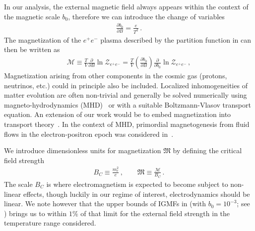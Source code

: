 In our analysis, the external magnetic field always appears within the context of the magnetic scale $b_{0}$, therefore we can introduce the change of variables
\begin{align}
 \frac{\partial b_{0}}{\partial{B}}=\frac{e}{T^{2}}\,.
\end{align}
The magnetization of the $e^{+}e^{-}$ plasma described by the partition function in  can then be written as
\begin{align}
 \label{defmagetization}
 \mathcal{M}\equiv\frac{T}{V}\frac{\partial}{\partial{B}}\ln{\mathcal{Z}_{e^{+}e^{-}}} = \frac{T}{V}\left(\frac{\partial b_{0}}{\partial{B}}\right)\frac{\partial}{\partial b_{0}}\ln{\mathcal{Z}_{e^{+}e^{-}}}\,,
\end{align}
Magnetization arising from other components in the cosmic gas (protons, neutrinos, etc.) could in principle also be included. Localized inhomogeneities of matter evolution are often non-trivial and generally be solved numerically using magneto-hydrodynamics (MHD)~\cite{melrose2008quantum,Vazza:2017qge,Vachaspati:2020blt} or with a suitable Boltzmann-Vlasov transport equation. An extension of our work would be to embed magnetization into transport theory~\cite{Formanek:2021blc}. In the context of MHD, primordial magnetogenesis from fluid flows in the electron-positron epoch was considered in~\cite{Gopal:2004ut,Perrone:2021srr}.

We introduce dimensionless units for magnetization ${\mathfrak M}$ by defining the critical field strength
\begin{align}
 {B}_{C}\equiv\frac{m_{e}^{2}}{e}\,,\qquad{\mathfrak M}\equiv\frac{\mathcal{M}}{{B}_{C}}\,.
\end{align}
The scale ${B}_{C}$ is where electromagnetism is expected to become subject to non-linear effects, though luckily in our regime of interest, electrodynamics should be linear. We note however that the upper bounds of IGMFs in  (with $b_{0}=10^{-3}$; see ) brings us to within $1\%$ of that limit for the external field strength in the temperature range considered.

